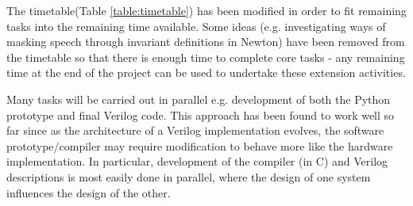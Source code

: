 \documentclass[pageno]{jpaper}
\begin{document}
The timetable(Table \ref{table:timetable}) has been modified in order to fit remaining tasks into the remaining time available. Some ideas (e.g. investigating ways of masking speech through invariant definitions in Newton) have been removed from the timetable so that there is enough time to complete core tasks - any remaining time at the end of the project can be used to undertake these extension activities.

Many tasks will be carried out in parallel e.g. development of both the Python prototype and final Verilog code. This approach has been found to work well so far since as the architecture of a Verilog implementation evolves, the software prototype/compiler may require modification to behave more like the hardware implementation. In particular, development of the compiler (in C) and Verilog descriptions is most easily done in parallel, where the design of one system influences the design of the other.
\end{document}
